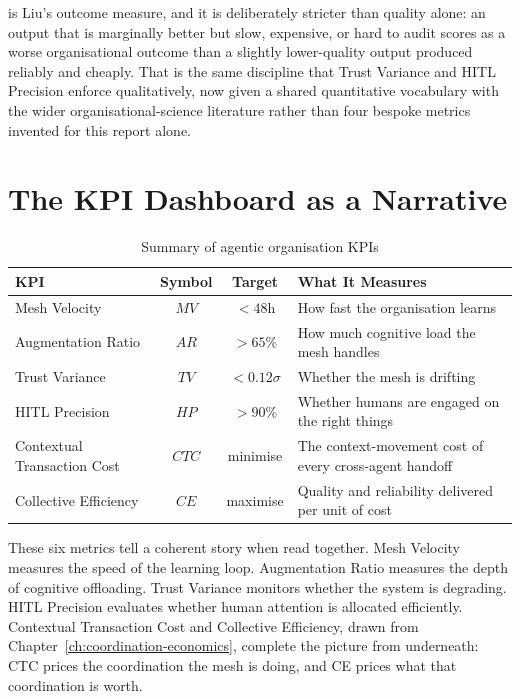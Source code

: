  is Liu's outcome measure, and it is deliberately stricter than quality alone: an output that is marginally better but slow, expensive, or hard to audit scores as a worse organisational outcome than a slightly lower-quality output produced reliably and cheaply. That is the same discipline that Trust Variance and HITL Precision enforce qualitatively, now given a shared quantitative vocabulary with the wider organisational-science literature rather than four bespoke metrics invented for this report alone.

\section{The KPI Dashboard as a Narrative}

\begin{table}[h]
\centering
\caption{Summary of agentic organisation KPIs}
\label{tab:kpi-summary}
\begin{tabularx}{\textwidth}{l c c X}
\toprule
\textbf{KPI} & \textbf{Symbol} & \textbf{Target} & \textbf{What It Measures} \\
\midrule
Mesh Velocity & $MV$ & $< 48\text{h}$ & How fast the organisation learns \\
\addlinespace
Augmentation Ratio & $AR$ & $> 65\%$ & How much cognitive load the mesh handles \\
\addlinespace
Trust Variance & $TV$ & $< 0.12\sigma$ & Whether the mesh is drifting \\
\addlinespace
HITL Precision & $HP$ & $> 90\%$ & Whether humans are engaged on the right things \\
\addlinespace
Contextual Transaction Cost & $CTC$ & minimise & The context-movement cost of every cross-agent handoff \\
\addlinespace
Collective Efficiency & $CE$ & maximise & Quality and reliability delivered per unit of cost \\
\bottomrule
\end{tabularx}
\end{table}

These six metrics tell a coherent story when read together. Mesh Velocity measures the speed of the learning loop. Augmentation Ratio measures the depth of cognitive offloading. Trust Variance monitors whether the system is degrading. HITL Precision evaluates whether human attention is allocated efficiently. Contextual Transaction Cost and Collective Efficiency, drawn from Chapter~\ref{ch:coordination-economics}, complete the picture from underneath: CTC prices the coordination the mesh is doing, and CE prices what that coordination is worth.


